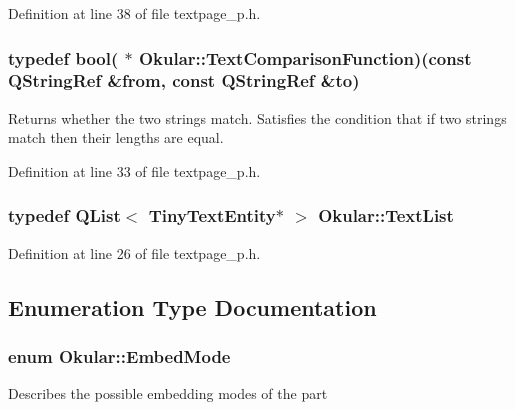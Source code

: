 Definition at line 38 of file textpage\+\_\+p.\+h.

\hypertarget{namespaceOkular_a686d56fd67c1b405491328f3f187a4b0}{
\subsubsection[{Text\+Comparison\+Function}]{\setlength{\rightskip}{0pt plus 5cm}typedef bool( $\ast$ Okular\+::\+Text\+Comparison\+Function)(const Q\+String\+Ref \&from, const Q\+String\+Ref \&to)}}\label{namespaceOkular_a686d56fd67c1b405491328f3f187a4b0}
Returns whether the two strings match. Satisfies the condition that if two strings match then their lengths are equal. 

Definition at line 33 of file textpage\+\_\+p.\+h.

\hypertarget{namespaceOkular_ae9075ed4d543c119d2e86fae7fc6cf46}{
\subsubsection[{Text\+List}]{\setlength{\rightskip}{0pt plus 5cm}typedef {\bf Q\+List}$<$ {\bf Tiny\+Text\+Entity}$\ast$ $>$ {\bf Okular\+::\+Text\+List}}}\label{namespaceOkular_ae9075ed4d543c119d2e86fae7fc6cf46}


Definition at line 26 of file textpage\+\_\+p.\+h.



\subsection{Enumeration Type Documentation}
\hypertarget{namespaceOkular_adbe21e337d65d3f5f07a441180428ba8}{
\subsubsection[{Embed\+Mode}]{\setlength{\rightskip}{0pt plus 5cm}enum {\bf Okular\+::\+Embed\+Mode}}}\label{namespaceOkular_adbe21e337d65d3f5f07a441180428ba8}
Describes the possible embedding modes of the part

